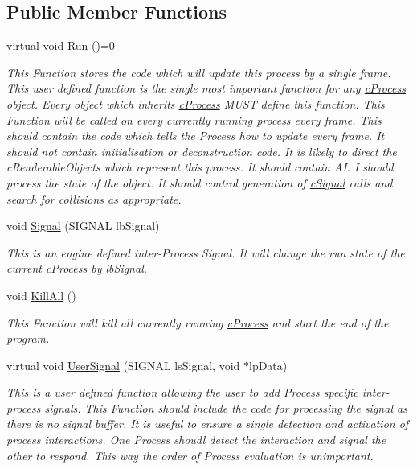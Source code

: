 \subsection*{Public Member Functions}
\begin{DoxyCompactItemize}
\item 
virtual void \hyperlink{classc_process_a3e0fab4ccc0a8fb065d50eb88b6a0dd5}{Run} ()=0
\begin{DoxyCompactList}\small\item\em This Function stores the code which will update this process by a single frame. This user defined function is the single most important function for any \hyperlink{classc_process}{cProcess} object. Every object which inherits \hyperlink{classc_process}{cProcess} MUST define this function. This Function will be called on every currently running process every frame. This should contain the code which tells the Process how to update every frame. It should not contain initialisation or deconstruction code. It is likely to direct the cRenderableObjects which represent this process. It should contain AI. I should process the state of the object. It should control generation of \hyperlink{classc_signal}{cSignal} calls and search for collisions as appropriate. \item\end{DoxyCompactList}\item 
void \hyperlink{classc_process_a784d2db8f81b9e258bd1662fecb8e068}{Signal} (SIGNAL lbSignal)
\begin{DoxyCompactList}\small\item\em This is an engine defined inter-\/Process Signal. It will change the run state of the current \hyperlink{classc_process}{cProcess} by lbSignal. \item\end{DoxyCompactList}\item 
void \hyperlink{classc_process_a7790410ef974a65c7227b83f3d0cd709}{KillAll} ()
\begin{DoxyCompactList}\small\item\em This Function will kill all currently running \hyperlink{classc_process}{cProcess} and start the end of the program. \item\end{DoxyCompactList}\item 
virtual void \hyperlink{classc_process_ac436ca09957adbf1c9cdea5ea0af9e9a}{UserSignal} (SIGNAL lsSignal, void $\ast$lpData)
\begin{DoxyCompactList}\small\item\em This is a user defined function allowing the user to add Process specific inter-\/process signals. This Function should include the code for processing the signal as there is no signal buffer. It is useful to ensure a single detection and activation of process interactions. One Process shoudl detect the interaction and signal the other to respond. This way the order of Process evaluation is unimportant. \item\end{DoxyCompactList}\item 

\end{DoxyCompactItemize}
